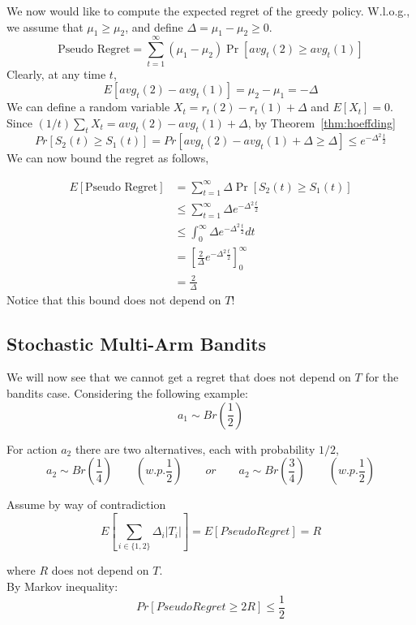 We now would like to compute the expected regret of the greedy
policy. W.l.o.g., we assume that $\mu_{1}\ge\mu_{2}$, and define
$\Delta=\mu_{1}-\mu_{2}\ge0$.
\[
\text{Pseudo Regret}= \sum_{t=1}^{\infty}(\mu_{1}-\mu_{2})
\Pr\left[avg_{t}(2)\ge avg_{t}(1)\right]
\]
Clearly, at any time $t$,
\[
E[avg_{t}(2)-avg_{t}(1)]=\mu_{2}-\mu_{1}=-\Delta
\]
We can define a random variable $X_t=r_t(2)-r_t(1)+\Delta$ and
$E[X_t]=0$. Since $(1/t)\sum_t X_t = avg_t(2)- avg_t(1)+\Delta$, by
Theorem~\ref{thm:hoeffding}
\[
Pr[S_2(t)\geq S_1(t)]= Pr\left[avg_{t}(2)-avg_{t}(1)+\Delta
\ge\Delta\right]\le e^{-\Delta^{2}\frac{t}{2}}
\]
We can now bound the regret as follows,

\begin{align*}
E\left[\text{Pseudo Regret}\right] & =
 \sum_{t=1}^{\infty}\Delta\Pr\left[S_{2}(t)\ge S_{1}(t)\right]\\
 & \le   \sum_{t=1}^{\infty}\Delta e^{-\Delta^{2}\frac{t}{2}}\\
 & \le   \int_{0}^{\infty}\Delta e^{-\Delta^{2}\frac{t}{2}}dt\\
 & =  \left[\frac{2}{\Delta}e^{-\Delta^{2}\frac{t}{2}}\right]_{0}^{\infty}\\
 & =  \frac{2}{\Delta}
\end{align*}
Notice that this bound does not depend on $T$!

\subsection{Stochastic Multi-Arm Bandits}


We will now see that we cannot get a regret that does not depend on
$T$ for the bandits case. Considering the following example:
\[
a_{1}\sim Br\left(\frac{1}{2}\right)\]

For action $a_2$ there are two alternatives, each with probability
$1/2$,
\[
a_{2}\sim Br\left(\frac{1}{4}\right)\qquad \left(w.p.
\frac{1}{2}\right) \qquad or \qquad a_{2}\sim
Br\left(\frac{3}{4}\right) \qquad \left(w.p. \frac{1}{2}\right)
\]

Assume by way of contradiction
\[
E\left[ \sum_{i \in \{1,2\}} \Delta_i |T_i|\right] = E\left[Pseudo
Regret\right]=R
\]

where $R$ does not depend on $T$. \\ By Markov inequality:
\[
Pr\left[Pseudo Regret\ge2R\right]\le\frac{1}{2}
\]

